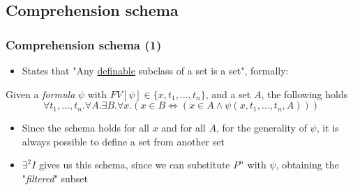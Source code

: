 \documentclass{beamer}
\begin{document}
            \subsection{Comprehension schema}
                \begin{frame}
                    \frametitle{Comprehension schema (1)}
                    \begin{itemize}
                        \item States that "Any \underline{definable} subclass of a set is a set", formally:
                    \end{itemize}
                    \begin{definition}
                        Given a \textit{formula} $ \psi $ with $ FV[\psi] \in \{ x, t_1, \dots, t_n \} $,  and a set $ A $, the following holds
                        \[
                            \forall t_1, \dots, t_n. \forall A. \exists B. \forall x. (x \in B \Leftrightarrow (x \in A \wedge \psi(x, t_1, \dots, t_n, A)))    
                        \]
                    \end{definition}
                    \begin{itemize}
                        \item Since the schema holds for all $ x $ and for all $ A $, for the generality of $ \psi $, it is always possible to define a set from another set
                        \item $ \exists^2I $ gives us this schema, since we can substitute $ P^n $ with $ \psi $, obtaining the "\textit{filtered}" subset
                    \end{itemize}
                \end{frame}
\end{document}
